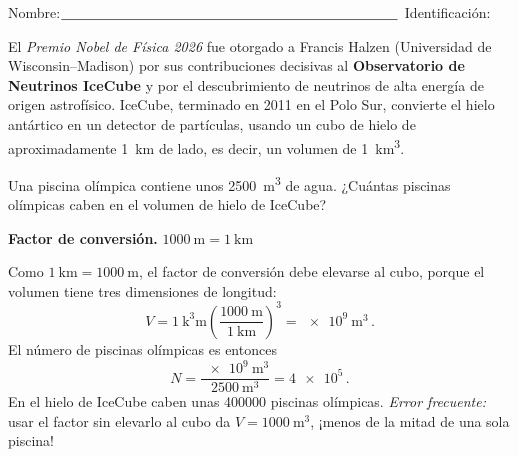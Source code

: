 \documentclass[12pt, a4paper]{article}
\begin{document}
\vspace*{-2cm}
Nombre:$\underline{\hspace{8.5cm}}$ Identificación: \hrulefill

\quad

\begin{exercise}[ID=icecube, subtitle={IceCube en piscinas olímpicas}, tags={parcial1}]
El \emph{Premio Nobel de Física 2026} fue otorgado a Francis Halzen
(Universidad de Wisconsin--Madison) por sus contribuciones decisivas al
\textbf{Observatorio de Neutrinos IceCube} y por el descubrimiento de
neutrinos de alta energía de origen astrofísico. IceCube, terminado en
2011 en el Polo Sur, convierte el hielo antártico en un detector de
partículas, usando un
cubo de hielo de aproximadamente \qty{1}{\kilo\metre} de lado, es decir,
un volumen de \qty{1}{\cubic\kilo\metre}.

Una piscina olímpica contiene unos \qty{2500}{\cubic\metre} de agua.
¿Cuántas piscinas olímpicas caben en el volumen de hielo de IceCube?

\textbf{Factor de conversión.}
$\qty{1000}{\metre} = \qty{1}{\kilo\metre}$

\vspace{6cm}
\end{exercise}
\begin{solution}
Como $\qty{1}{\kilo\metre} = \qty{1000}{\metre}$, el factor de conversión
debe elevarse al cubo, porque el volumen tiene tres dimensiones de longitud:
\begin{equation*}
  V = \qty{1}{\cubic\kilo\metre}
      \left(\frac{\qty{1000}{\metre}}{\qty{1}{\kilo\metre}}\right)^{3}
    = \qty{e9}{\cubic\metre} \,.
\end{equation*}
El número de piscinas olímpicas es entonces
\begin{equation*}
  N = \frac{\qty{e9}{\cubic\metre}}{\qty{2500}{\cubic\metre}}
    = \num{4e5} \,.
\end{equation*}
En el hielo de IceCube caben unas \num{400000} piscinas olímpicas.
\emph{Error frecuente:} usar el factor sin elevarlo al cubo da
$V = \qty{1000}{\cubic\metre}$, ¡menos de la mitad de una sola piscina!
\end{solution}
\end{document}
